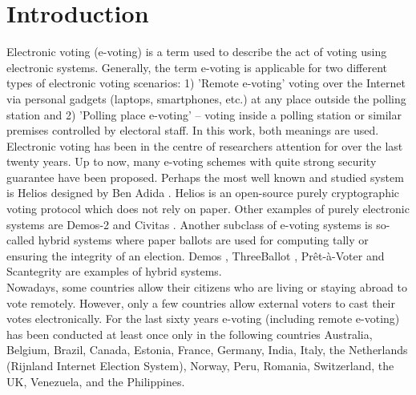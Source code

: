 \chapter{Introduction}

Electronic voting (e-voting) is a term used to describe the act of voting using electronic systems. Generally, the term e-voting is applicable for two different types of electronic voting scenarios:  1) 'Remote e-voting' voting over the Internet via personal gadgets (laptops, smartphones, etc.) at any place outside the polling station and  2) 'Polling place e-voting' -- voting inside a polling station or similar premises controlled by electoral staff. In this work, both meanings are used.\\

Electronic voting has been in the centre of researchers attention for over the last twenty years. Up to now, many e-voting schemes with quite strong security guarantee have been proposed. Perhaps the most well known and studied system is Helios designed by Ben Adida \cite{Adida2008}.  Helios is an open-source purely cryptographic voting protocol which does not rely on paper. Other examples of purely electronic systems are Demos-2 \cite{Kiayias2015} and Civitas \cite{Clarkson2008}.  Another subclass of e-voting systems is so-called hybrid systems where paper ballots are used for computing tally or ensuring the integrity of an election. Demos \cite{Kiayias2015a}, ThreeBallot \cite{Rivest2006}, Pr\^{e}t-\`a-Voter \cite{Ryan2006} and Scantegrity \cite{Chaum2009} are examples of hybrid systems.  \\

Nowadays, some countries allow their citizens who are living or staying abroad to vote remotely. However, only a few countries allow external voters to cast their votes electronically. For the last sixty years e-voting (including remote e-voting) has been conducted at least once only in the following countries Australia, Belgium, Brazil, Canada, Estonia, France, Germany, India, Italy, the Netherlands (Rijnland Internet Election System), Norway, Peru, Romania, Switzerland, the UK, Venezuela, and the Philippines.\\

